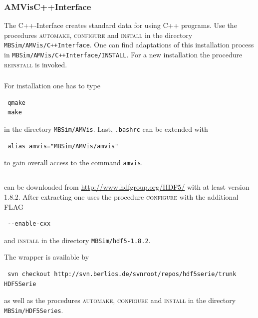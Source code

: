\subsubsection{AMVisC++Interface}
The C++-Interface creates standard data for \AMVis{} using C++ programs. Use the procedures \textsc{automake, configure} and \textsc{install} in the directory \texttt{MBSim/AMVis/C++Interface}. One can find adaptations of this installation process in \texttt{MBSim/AMVis/C++Interface/INSTALL}.  For a new installation the procedure \textsc{reinstall} is invoked.

\subsubsection{\AMVis{}}
For installation one has to type 
\begin{verbatim}
 qmake
 make
\end{verbatim}
in the directory \texttt{MBSim/AMVis}. Last, \texttt{.bashrc} can be extended with
\begin{verbatim}
 alias amvis="MBSim/AMVis/amvis"
\end{verbatim}
to gain overall access to the command \texttt{amvis}.

\subsection{\HDF}
\HDF can be downloaded from \url{http://www.hdfgroup.org/HDF5/} with at least version 1.8.2. After extracting one uses the procedure \textsc{configure} with the additional FLAG
\begin{verbatim}
 --enable-cxx
\end{verbatim}
and \textsc{install} in the directory \texttt{MBSim/hdf5-1.8.2}.

The \HDF wrapper is available by
\begin{verbatim}
 svn checkout http://svn.berlios.de/svnroot/repos/hdf5serie/trunk HDF5Serie
\end{verbatim}
as well as the procedures \textsc{automake, configure} and \textsc{install} in the directory \texttt{MBSim/HDF5Series}.

